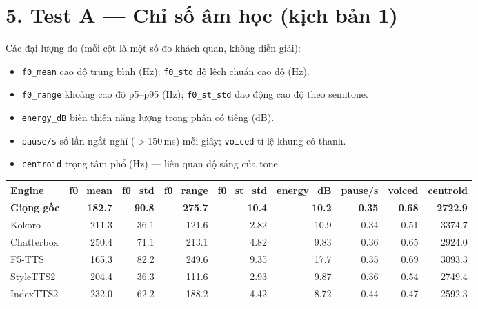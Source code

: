 \documentclass[11pt]{article}
\begin{document}
\section*{5. Test A — Chỉ số âm học (kịch bản 1)}
Các đại lượng đo (mỗi cột là một số đo khách quan, không diễn giải):
\begin{itemize}\setlength\itemsep{0pt}
\item \texttt{f0\_mean} cao độ trung bình (Hz); \texttt{f0\_std} độ lệch chuẩn cao độ (Hz).
\item \texttt{f0\_range} khoảng cao độ p5--p95 (Hz); \texttt{f0\_st\_std} dao động cao độ theo semitone.
\item \texttt{energy\_dB} biến thiên năng lượng trong phần có tiếng (dB).
\item \texttt{pause/s} số lần ngắt nghỉ ($>$150\,ms) mỗi giây; \texttt{voiced} tỉ lệ khung có thanh.
\item \texttt{centroid} trọng tâm phổ (Hz) — liên quan độ sáng của tone.
\end{itemize}
\begin{table}[H]\centering\small
\begin{tabular}{l r r r r r r r r}
\toprule
Engine & f0\_mean & f0\_std & f0\_range & f0\_st\_std & energy\_dB & pause/s & voiced & centroid \\
\midrule
\textbf{Giọng gốc} & \textbf{182.7} & \textbf{90.8} & \textbf{275.7} & \textbf{10.4} & \textbf{10.2} & \textbf{0.35} & \textbf{0.68} & \textbf{2722.9} \\
\midrule
Kokoro & 211.3 & 36.1 & 121.6 & 2.82 & 10.9 & 0.34 & 0.51 & 3374.7 \\
Chatterbox & 250.4 & 71.1 & 213.1 & 4.82 & 9.83 & 0.36 & 0.65 & 2924.0 \\
F5-TTS & 165.3 & 82.2 & 249.6 & 9.35 & 17.7 & 0.35 & 0.69 & 3093.3 \\
StyleTTS2 & 204.4 & 36.3 & 111.6 & 2.93 & 9.87 & 0.36 & 0.54 & 2749.4 \\
IndexTTS2 & 232.0 & 62.2 & 188.2 & 4.42 & 8.72 & 0.44 & 0.47 & 2592.3 \\
\bottomrule
\end{tabular}
\end{table}
\end{document}
